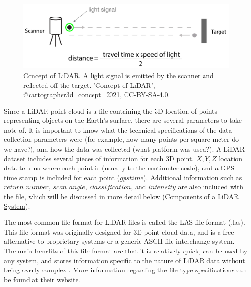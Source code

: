 \documentclass[
]{book}
\begin{document}
\begin{figure}
\includegraphics[width=0.8\linewidth]{images/15-Concept-of-LiDAR} \caption{Concept of LiDAR. A light signal is emitted by the scanner and reflected off the target. 'Concept of LiDAR', @cartographer3d_concept_2021, CC-BY-SA-4.0.}\label{fig:15-Concept-of-LiDAR}
\end{figure}

Since a LiDAR point cloud is a file containing the 3D location of points representing objects on the Earth's surface, there are several parameters to take note of. It is important to know what the technical specifications of the data collection parameters were (for example, how many points per square meter do we have?), and how the data was collected (what platform was used?). A LiDAR dataset includes several pieces of information for each 3D point. \(X,Y,Z\) location data tells us where each point is (usually to the centimeter scale), and a GPS time stamp is included for each point (\(gpstime\)). Additional information such as \(return\) \(number\), \(scan\) \(angle\), \(classification\), and \(intensity\) are also included with the file, which will be discussed in more detail below (\hyperref[components-of-a-lidar-system]{Components of a LiDAR System}).

The most common file format for LiDAR files is called the LAS file format (.las). This file format was originally designed for 3D point cloud data, and is a free alternative to proprietary systems or a generic ASCII file interchange system. The main benefits of this file format are that it is relatively quick, can be used by any system, and stores information specific to the nature of LiDAR data without being overly complex \citep{american_society_for_photogrammetry__remote_sensing_laser_2019}. More information regarding the file type specifications can be found \href{https://www.asprs.org/divisions-committees/lidar-division/laser-las-file-format-exchange-activities}{at their website}.
\end{document}
